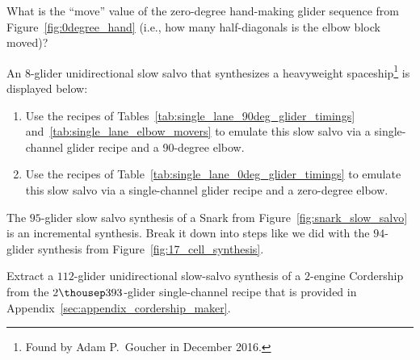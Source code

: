 \begin{multicols}{2}
	
	\mfilbreak
	
	
	\begin{problemstar}\label{exer:0degree_hand_move} 
		What is the ``move'' value of the zero-degree hand-making glider sequence from Figure~\ref{fig:0degree_hand} (i.e., how many half-diagonals is the elbow block moved)?
	\end{problemstar}
	
	
	\mfilbreak
	
	
	\begin{problem}\label{exer:exercise_hwss_slow_salvo} 
		An 8-glider unidirectional slow salvo that synthesizes a heavyweight spaceship\footnote{Found by Adam P.~Goucher in December 2016.} is displayed below:
		
		\noindent\begin{center}
		\end{center}
		
		\begin{enumerate}[label=\bf\color{ocre}(\alph*)]
			\item Use the recipes of Tables~\ref{tab:single_lane_90deg_glider_timings} and~\ref{tab:single_lane_elbow_movers} to emulate this slow salvo via a single-channel glider recipe and a 90-degree elbow.
			
			\item Use the recipes of Table~\ref{tab:single_lane_0deg_glider_timings} to emulate this slow salvo via a single-channel glider recipe and a zero-degree elbow.
		\end{enumerate}
	\end{problem}
	
	
	\mfilbreak
	
	
	\begin{problem}\label{exer:snark_slow_salvo_pieces} 
		The $95$-glider slow salvo synthesis of a Snark from Figure~\ref{fig:snark_slow_salvo} is an incremental synthesis. Break it down into steps like we did with the $94$-glider synthesis from Figure~\ref{fig:17_cell_synthesis}.
	\end{problem}
	
	
	\mfilbreak
	
	
	\begin{problem}\label{exer:cordership_slow_salvo_from_single_channel} 
		Extract a $112$-glider unidirectional slow-salvo synthesis of a $2$-engine Cordership from the $2{\thousep}393$-glider single-channel recipe that is provided in Appendix~\ref{sec:appendix_cordership_maker}.
	\end{problem}
	

\end{multicols}
